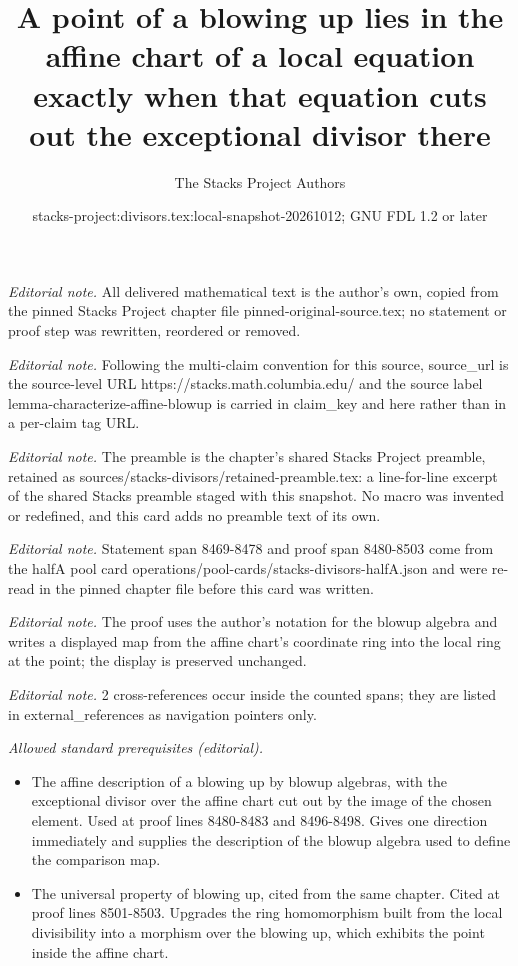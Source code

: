 \documentclass[10pt,a4paper]{amsart}
\title{A point of a blowing up lies in the affine chart of a local equation exactly when that equation cuts out the exceptional divisor there}
\author{The Stacks Project Authors}
\date{stacks-project:divisors.tex:local-snapshot-20261012; GNU FDL 1.2 or later}
\theoremstyle{plain}
\theoremstyle{definition}
\theoremstyle{remark}
\numberwithin{equation}{subsection}
\begin{document}
\maketitle
\noindent\textit{Editorial note.} All delivered mathematical text is the author's own, copied from the pinned Stacks Project chapter file pinned-original-source.tex; no statement or proof step was rewritten, reordered or removed.\par\medskip
\noindent\textit{Editorial note.} Following the multi-claim convention for this source, source\_url is the source-level URL https://stacks.math.columbia.edu/ and the source label lemma-characterize-affine-blowup is carried in claim\_key and here rather than in a per-claim tag URL.\par\medskip
\noindent\textit{Editorial note.} The preamble is the chapter's shared Stacks Project preamble, retained as sources/stacks-divisors/retained-preamble.tex: a line-for-line excerpt of the shared Stacks preamble staged with this snapshot. No macro was invented or redefined, and this card adds no preamble text of its own.\par\medskip
\noindent\textit{Editorial note.} Statement span 8469-8478 and proof span 8480-8503 come from the halfA pool card operations/pool-cards/stacks-divisors-halfA.json and were re-read in the pinned chapter file before this card was written.\par\medskip
\noindent\textit{Editorial note.} The proof uses the author's notation for the blowup algebra and writes a displayed map from the affine chart's coordinate ring into the local ring at the point; the display is preserved unchanged.\par\medskip
\noindent\textit{Editorial note.} 2 cross-references occur inside the counted spans; they are listed in external\_references as navigation pointers only.\par\medskip
\noindent\textit{Allowed standard prerequisites (editorial).}\begin{itemize}
\item The affine description of a blowing up by blowup algebras, with the exceptional divisor over the affine chart cut out by the image of the chosen element. Used at proof lines 8480-8483 and 8496-8498. Gives one direction immediately and supplies the description of the blowup algebra used to define the comparison map.
\item The universal property of blowing up, cited from the same chapter. Cited at proof lines 8501-8503. Upgrades the ring homomorphism built from the local divisibility into a morphism over the blowing up, which exhibits the point inside the affine chart.
\end{itemize}\medskip
\end{document}
